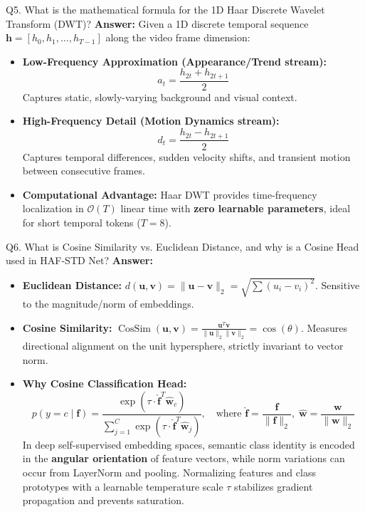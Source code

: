 \documentclass[a4paper, 11pt]{article}
\begin{document}
\begin{questionbox}{Q5. What is the mathematical formula for the 1D Haar Discrete Wavelet Transform (DWT)?}
\textbf{Answer:}
Given a 1D discrete temporal sequence $\mathbf{h} = [h_0, h_1, \dots, h_{T-1}]$ along the video frame dimension:
\begin{itemize}
    \item \textbf{Low-Frequency Approximation (Appearance/Trend stream):}
    \[
    a_t = \frac{h_{2t} + h_{2t+1}}{2}
    \]
    Captures static, slowly-varying background and visual context.
    \item \textbf{High-Frequency Detail (Motion Dynamics stream):}
    \[
    d_t = \frac{h_{2t} - h_{2t+1}}{2}
    \]
    Captures temporal differences, sudden velocity shifts, and transient motion between consecutive frames.
    \item \textbf{Computational Advantage:} Haar DWT provides time-frequency localization in $\mathcal{O}(T)$ linear time with \textbf{zero learnable parameters}, ideal for short temporal tokens ($T=8$).
\end{itemize}
\end{questionbox}

\begin{questionbox}{Q6. What is Cosine Similarity vs. Euclidean Distance, and why is a Cosine Head used in HAF-STD Net?}
\textbf{Answer:}
\begin{itemize}
    \item \textbf{Euclidean Distance:} $d(\mathbf{u}, \mathbf{v}) = \|\mathbf{u} - \mathbf{v}\|_2 = \sqrt{\sum (u_i - v_i)^2}$. Sensitive to the magnitude/norm of embeddings.
    \item \textbf{Cosine Similarity:} $\operatorname{CosSim}(\mathbf{u}, \mathbf{v}) = \frac{\mathbf{u}^T \mathbf{v}}{\|\mathbf{u}\|_2 \|\mathbf{v}\|_2} = \cos(\theta)$. Measures directional alignment on the unit hypersphere, strictly invariant to vector norm.
    \item \textbf{Why Cosine Classification Head:}
    \[
    p(y=c \mid \mathbf{f}) = \frac{\exp\left(\tau \cdot \hat{\mathbf{f}}^T \hat{\mathbf{w}}_c\right)}{\sum_{j=1}^C \exp\left(\tau \cdot \hat{\mathbf{f}}^T \hat{\mathbf{w}}_j\right)}, \quad \text{where } \hat{\mathbf{f}} = \frac{\mathbf{f}}{\|\mathbf{f}\|_2}, \; \hat{\mathbf{w}} = \frac{\mathbf{w}}{\|\mathbf{w}\|_2}
    \]
    In deep self-supervised embedding spaces, semantic class identity is encoded in the \textbf{angular orientation} of feature vectors, while norm variations can occur from LayerNorm and pooling. Normalizing features and class prototypes with a learnable temperature scale $\tau$ stabilizes gradient propagation and prevents saturation.
\end{itemize}
\end{questionbox}
\end{document}
